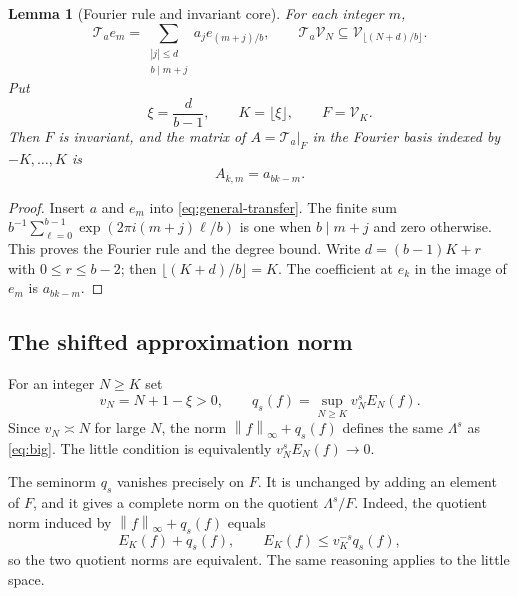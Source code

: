 \documentclass[11pt,a4paper]{article}
\numberwithin{equation}{section}
\newtheorem{lemma}[theorem]{Lemma}
\theoremstyle{definition}
\theoremstyle{remark}
\newcommand{\Ta}{\mathcal T_a}
\newcommand{\V}{\mathcal V}
\newcommand{\norm}[1]{\left\lVert#1\right\rVert}
\begin{document}
\begin{lemma}[Fourier rule and invariant core]
\label{lem:fourier}
For each integer $m$,
\begin{equation}
 \Ta e_m=\sum_{\substack{|j|\le d\\b\mid m+j}}
 a_j e_{(m+j)/b},\qquad
 \Ta\V_N\subseteq\V_{\lfloor(N+d)/b\rfloor}.
 \label{eq:fourier-general}
\end{equation}
Put
\begin{equation}
 \xi=\frac d{b-1},\qquad K=\lfloor\xi\rfloor,\qquad F=\V_K.
 \label{eq:core-size}
\end{equation}
Then $F$ is invariant, and the matrix of $A=\Ta|_F$ in the Fourier
basis indexed by $-K,\ldots,K$ is
\begin{equation}
 A_{k,m}=a_{bk-m}.
 \label{eq:matrix}
\end{equation}
\end{lemma}
\begin{proof}
Insert $a$ and $e_m$ into \eqref{eq:general-transfer}. The finite sum
$b^{-1}\sum_{\ell=0}^{b-1}\exp(2\pi i(m+j)\ell/b)$ is one when
$b\mid m+j$ and zero otherwise. This proves the Fourier rule and the
degree bound. Write $d=(b-1)K+r$ with $0\le r\le b-2$; then
$\lfloor(K+d)/b\rfloor=K$. The coefficient at $e_k$ in the image of
$e_m$ is $a_{bk-m}$.
\end{proof}

\subsection{The shifted approximation norm}
For an integer $N\ge K$ set
\begin{equation}
 v_N=N+1-\xi>0,
 \qquad q_s(f)=\sup_{N\ge K}v_N^s E_N(f).
 \label{eq:shifted-seminorm}
\end{equation}
Since $v_N\asymp N$ for large $N$, the norm
$\norm f_\infty+q_s(f)$ defines the same $\Lambda^s$ as
\eqref{eq:big}. The little condition is equivalently
$v_N^sE_N(f)\to0$.

The seminorm $q_s$ vanishes precisely on $F$. It is unchanged by adding
an element of $F$, and it gives a complete norm on the quotient
$\Lambda^s/F$. Indeed, the quotient norm induced by
$\norm f_\infty+q_s(f)$ equals
\begin{equation}
 E_K(f)+q_s(f),\qquad
 E_K(f)\le v_K^{-s}q_s(f),
 \label{eq:quotient-norm}
\end{equation}
so the two quotient norms are equivalent. The same reasoning applies to
the little space.
\end{document}
